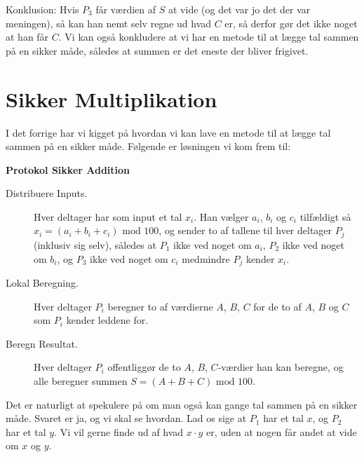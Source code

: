 \documentclass{article}
\theoremstyle{opgavedd}
\newcommand\nsmod{\ensuremath{\text{ mod }}}
\begin{document}
Konklusion: Hvis $P_{3}$ får værdien af $S$ at vide (og det var jo det der var meningen),
så kan han nemt selv regne ud hvad $C$ er, så derfor gør det ikke noget at han får $C$. Vi
kan også konkludere at vi har en metode til at lægge tal sammen på en sikker måde, således
at summen er det eneste der bliver frigivet.

\section{Sikker Multiplikation}
I det forrige har vi kigget på hvordan vi kan lave en metode til at lægge tal sammen på en
sikker måde. Følgende er løsningen vi kom frem til:

\begin{framed}
  \begin{center}
    \textbf{Protokol Sikker Addition}
  \end{center}
  \begin{description}
  \item[Distribuere Inputs.] Hver deltager har som input et tal $x_{i}$. Han vælger
    $a_{i}$, $b_{i}$ og $c_{i}$ tilfældigt så $x_{i} = (a_{i}+b_{i}+c_{i})\nsmod{100}$, og
    sender to af tallene til hver deltager $P_{j}$ (inklusiv sig selv), således at $P_{1}$
    ikke ved noget om $a_{i}$, $P_{2}$ ikke ved noget om $b_{i}$, og $P_{3}$ ikke ved
    noget om $c_{i}$ medmindre $P_{j}$ kender $x_{i}$.

  \item[Lokal Beregning.] Hver deltager $P_{i}$ beregner to af værdierne $A$, $B$, $C$ for
    de to af $A$, $B$ og $C$ som $P_{i}$ kender leddene for.

  \item[Beregn Resultat.] Hver deltager $P_{i}$ offentliggør de to $A$, $B$, $C$-værdier
    han kan beregne, og alle beregner summen $S=(A+B+C)\nsmod{100}$.
  \end{description}
\end{framed}

Det er naturligt at spekulere på om man også kan gange tal sammen på en sikker
måde. Svaret er ja, og vi skal se hvordan. Lad os sige at $P_{1}$ har et tal $x$, og
$P_{2}$ har et tal $y$. Vi vil gerne finde ud af hvad $x\cdot y$ er, uden at nogen får
andet at vide om $x$ og $y$.
\end{document}
